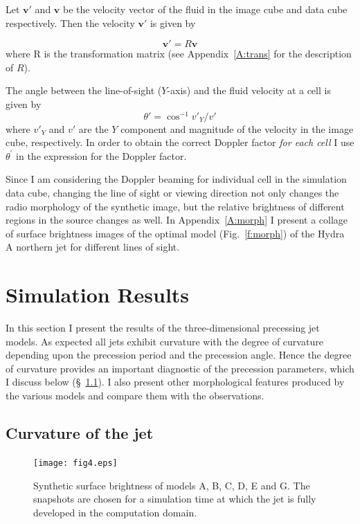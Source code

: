 Let $\textbf{v}'$ and $\textbf{v}$ be the velocity vector of the fluid in the image cube and data cube respectively. Then the velocity $\textbf{v}'$ is given by 

\begin{equation}
\textbf{v}' = R \textbf{v}
\end{equation}
where R is the transformation matrix (see Appendix~\ref{A:trans} for the description of $R$).

The angle between the line-of-sight ($Y$-axis) and the fluid velocity at a cell is given by 
\begin{equation}
\theta' = \cos^{-1}v'_Y / v'
\end{equation}
where $v'_Y$ and $v'$ are the $Y$ component and magnitude of the velocity in the image cube, respectively. In order to obtain the correct Doppler factor \emph{for each cell} I use $\theta^{\prime}$ in the expression for the Doppler factor.

Since I am considering the Doppler beaming for individual cell in the simulation data cube, changing the line of sight or viewing direction not only changes the radio morphology of the synthetic image, but the relative brightness of different regions in the source changes as well. In Appendix~\ref{A:morph} I present a collage of surface brightness images of the optimal model (Fig.~\ref{f:morph}) of the Hydra A northern jet for different lines of sight.



%
%

\section{Simulation Results}\label{s:results}

In this section I present the results of the three-dimensional precessing jet models. As expected all jets exhibit curvature with the degree of curvature depending upon the precession period and the precession angle. Hence the degree of curvature provides an important diagnostic of the precession parameters, which I discuss below (\S~\ref{curvature}).  I also present other morphological features produced by the various models and compare them with the observations.   
  
\subsection{Curvature of the jet}
\label{curvature}
\begin{figure}
\centering
\texttt{[image: fig4.eps]}
\caption{Synthetic surface brightness of models A, B, C, D, E and G. The snapshots are chosen for a simulation time at which the jet is fully developed in the computation domain. }
\label{f:cur}
\end{figure}

